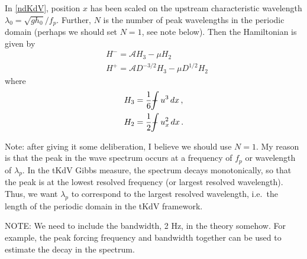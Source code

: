 \documentclass[11pt]{article}
\newcommand{\lamfac}{N}
\newcommand{\ampp}{\mathcal{A}}
\newcommand{\Hp}{H^{+}}
\newcommand{\Hm}{H^{-}}
\def\Xint#1{\mathchoice
   {\XXint\displaystyle\textstyle{#1}}%
   {\XXint\textstyle\scriptstyle{#1}}%
   {\XXint\scriptstyle\scriptscriptstyle{#1}}%
   {\XXint\scriptscriptstyle\scriptscriptstyle{#1}}%
   \!\int}
\def\XXint#1#2#3{{\setbox0=\hbox{$#1{#2#3}{\int}$}
     \vcenter{\hbox{$#2#3$}}\kern-.5\wd0}}
\def\dashint{\Xint-}
\newcommand{\intt}{\dashint}%
\newcommand{\dx}{\, dx}
\begin{document}
In \eqref{ndKdV}, position $x$ has been scaled on the upstream characteristic wavelength $\lambda_0 = \sqrt{g h_0}/f_p$. Further, $\lamfac$ is the number of peak wavelengths in the periodic domain (perhaps we should set $\lamfac=1$, see note below).
Then the Hamiltonian is given by
\begin{align}
\label{Hamiltonian}
& \Hm = \ampp H_3 - \mu H_2 \\
& \Hp = \ampp D^{-3/2} H_3 - \mu D^{1/2} H_2
\end{align}
where
\begin{align}
&H_3 = \frac{1}{6} \intt u^3 \dx	\, , \\
&H_2 = \frac{1}{2} \intt u_x^2 \dx	\, .
\end{align}

Note: after giving it some deliberation, I believe we should use $\lamfac=1$. My reason is that the peak in the wave spectrum occurs at a frequency of $f_p$ or wavelength of $\lambda_p$. In the tKdV Gibbs measure, the spectrum decays monotonically, so that the peak is at the lowest resolved frequency (or largest resolved wavelength). Thus, we want $\lambda_p$ to correspond to the largest resolved wavelength, i.e.~the length of the periodic domain in the tKdV framework.


NOTE: We need to include the bandwidth, 2 Hz, in the theory somehow. For example, the peak forcing frequency and bandwidth together can be used to estimate the decay in the spectrum.
\end{document}
